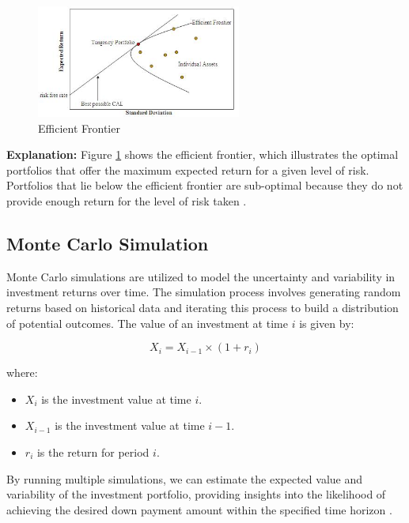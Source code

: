 \begin{figure}[h!]
    \centering
    \includegraphics[width=0.6\textwidth]{../Figures/efficient_frontier.png}
    \caption{Efficient Frontier}
    \label{fig:efficient_frontier}
\end{figure}

\textbf{Explanation:} Figure \ref{fig:efficient_frontier} shows the efficient frontier, which illustrates the optimal portfolios that offer the maximum expected return for a given level of risk. Portfolios that lie below the efficient frontier are sub-optimal because they do not provide enough return for the level of risk taken \citep{markowitz1952portfolio}.

\subsection{Monte Carlo Simulation}
Monte Carlo simulations are utilized to model the uncertainty and variability in investment returns over time. The simulation process involves generating random returns based on historical data and iterating this process to build a distribution of potential outcomes. The value of an investment at time $i$ is given by:

\begin{equation}
X_i = X_{i-1} \times (1 + r_i)
\end{equation}

where:
\begin{itemize}
    \item $X_i$ is the investment value at time $i$.
    \item $X_{i-1}$ is the investment value at time $i-1$.
    \item $r_i$ is the return for period $i$.
\end{itemize}

By running multiple simulations, we can estimate the expected value and variability of the investment portfolio, providing insights into the likelihood of achieving the desired down payment amount within the specified time horizon \citep{glasserman2004monte}.

